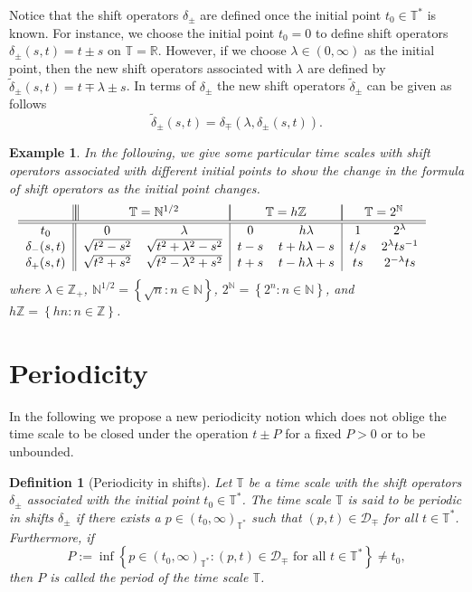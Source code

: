 \documentclass[b5paper,reqno]{amsart}\usepackage{amsfonts}
\theoremstyle{plain}
\newtheorem{definition}{Definition}
\newtheorem{example}{Example}
\numberwithin{equation}{section}
\begin{document}
Notice that the shift operators $\delta_{\pm}$ are defined once the initial
point $t_{0}\in\mathbb{T}^{\ast}$ is known. For instance, we choose the
initial point $t_{0}=0$ to define shift operators $\delta_{\pm}(s,t)=t\pm s$
on $\mathbb{T}=\mathbb{R}$. However, if we choose $\lambda\in(0,\infty)$ as
the initial point, then the new shift operators associated with $\lambda$ are
defined by $\widetilde{\delta}_{\pm}(s,t)=t\mp\lambda\pm s$. In terms of
$\delta_{\pm}$ the new shift operators $\widetilde{\delta}_{\pm}$ can be given
as follows\[
\widetilde{\delta}_{\pm}(s,t)=\delta_{\mp}(\lambda,\delta_{\pm}(s,t)).
\]

\begin{example}
In the following, we give some particular time scales with shift operators
associated with different initial points to show the change in the formula of
shift operators as the initial point changes.\[\begin{tabular}
[c]{c||cc|cc|cc}
& \multicolumn{2}{||c|}{$\mathbb{T}=\mathbb{N}^{1/2}$} &
\multicolumn{2}{|c|}{$\mathbb{T}=h\mathbb{Z}$} &
\multicolumn{2}{|c}{$\mathbb{T}=2^{\mathbb{N}}$}\\\hline\hline
$t_{0}$ & $0$ & $\lambda$ & $0$ & $h\lambda$ & $1$ & $2^{\lambda}$\\
$\delta_{-}(s,t)$ & $\sqrt{t^{2}-s^{2}}$ & $\sqrt{t^{2}+\lambda^{2}-s^{2}}$ &
$t-s$ & $t+h\lambda-s$ & $t/s$ & $2^{\lambda}ts^{-1}$\\
$\delta_{+}(s,t)$ & $\sqrt{t^{2}+s^{2}}$ & $\sqrt{t^{2}-\lambda^{2}+s^{2}}$ &
$t+s$ & $t-h\lambda+s$ & $ts$ & $2^{-\lambda}ts$\end{tabular}
\ \ \ \ \ \ \
\]
where $\lambda\in\mathbb{Z}_{+}$, $\mathbb{N}^{1/2}=\left\{  \sqrt{n}:n\in\mathbb{N}\right\}  $, $2^{\mathbb{N}}=\left\{  2^{n}:n\in\mathbb{N}\right\}  $, and $h\mathbb{Z=}\left\{  hn:n\in\mathbb{Z}\right\}  $.
\end{example}

\section{Periodicity}

In the following we propose a new periodicity notion which does not oblige the
time scale to be closed under the operation $t\pm P$ for a fixed $P>0$ or to
be unbounded.

\begin{definition}
[Periodicity in shifts]\label{new per}Let $\mathbb{T}$ be a time scale with
the shift operators $\delta_{\pm}$ associated with the initial point $t_{0}\in\mathbb{T}^{\ast}$. The time scale $\mathbb{T}$ is said to be\emph{
\emph{periodic in} shifts }$\delta_{\pm}$ if there exists a $p\in(t_{0},\infty)_{\mathbb{T}^{\ast}}$ such that $(p,t)\in\mathcal{D}_{\mp}$ for all
$t\in\mathbb{T}^{\ast}$. Furthermore, if\[
P:=\inf\left\{  p\in(t_{0},\infty)_{\mathbb{T}^{\ast}}:(p,t)\in\mathcal{D}_{\mp}\text{ for all }t\in\mathbb{T}^{\ast}\right\}  \neq t_{0},
\]
then $P$ is called the \emph{period} of the time scale $\mathbb{T}$.
\end{definition}
\end{document}
